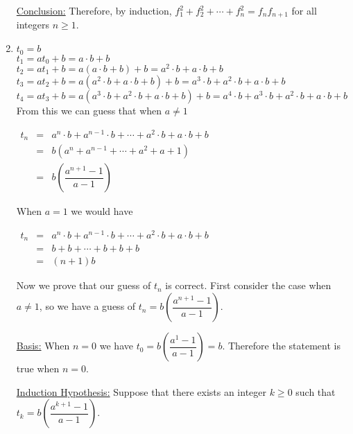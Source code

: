\documentclass[11 pt]{article}%
\begin{document}
\begin{enumerate}
\underline{Conclusion:} Therefore, by induction, $f_1^2 + f_2^2 + \cdots + f_n^2 = f_{n}f_{n+1}$ for all integers $n\geq 1$.


\item 
$t_0 = b$ \\
$t_1 = a t_0 + b = a\cdot b + b$ \\
$t_2 = a t_1 + b = a(a\cdot b + b) + b = a^2\cdot b + a \cdot b + b$ \\
$t_3 = a t_2 + b = a(a^2\cdot b + a \cdot b + b) + b = a^3 \cdot b+ a^2 \cdot b + a\cdot b + b$ \\ 
$t_4 = a t_3 + b = a(a^3 \cdot b+ a^2 \cdot b + a\cdot b + b) + b = a^4\cdot b + a^3 \cdot b+ a^2 \cdot b + a\cdot b + b$ \\

From this we can guess that when $a\neq 1$
\begin{center}
$\begin{array}{ccl}
t_n & = & a^n \cdot b+ a^{n-1} \cdot b + \cdots + a^2 \cdot b + a\cdot b + b \\
& = & b (a^n + a^{n-1} + \cdots + a^2 + a + 1) \\ 
& = & b \left( \dfrac{a^{n+1} - 1}{a-1}\right)
\end{array}$
\end{center}

When $a=1$ we would have
\begin{center}
$\begin{array}{ccl}
t_n & = & a^n \cdot b+ a^{n-1} \cdot b + \cdots + a^2 \cdot b + a\cdot b + b \\
 & = & b + b + \cdots + b + b + b \\
 & = & (n+1)b
 \end{array}$
 \end{center}

Now we prove that our guess of $t_n$ is correct. First consider the case when $a\neq 1$, so we have a guess of $t_n = b \left( \dfrac{a^{n+1} - 1}{a-1}\right)$.


\underline{Basis:} When $n=0$ we have $t_0 = b\left( \dfrac{a^{1} - 1}{a-1}\right) = b$. Therefore the statement is true when $n=0$.

\underline{Induction Hypothesis:} Suppose that there exists an integer $k\geq 0$ such that $t_k = b \left( \dfrac{a^{k+1} - 1}{a-1}\right)$.


\end{enumerate}
\end{document}
